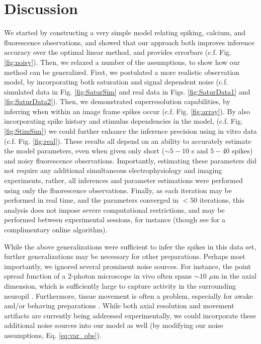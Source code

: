 \documentclass[12pt]{article}
\begin{document}

\section*{Discussion}


We started by constructing a very simple model relating spiking, calcium, and fluorescence observations, and showed that our approach both improves inference accuracy over the optimal linear method, and provides errorbars (c.f. Fig. \ref{fig:noisy}). Then, we relaxed a number of the assumptions, to show how our method can be generalized. First, we postulated a more realistic observation model, by incorporating both saturation and signal dependent noise (c.f. simulated data in Fig. \ref{fig:SaturSim} and real data in Figs. \ref{fig:SaturData1} and \ref{fig:SaturData2}). Then, we demonstrated superresolution capabilities, by inferring when within an image frame spikes occur (c.f. Fig. \ref{fig:array}). By also incorporating spike history and stimulus dependencies in the model, (c.f. Fig. \ref{fig:StimSim}) we could further enhance the inference precision using in vitro data (c.f. Fig. \ref{fig:real}). These results all depend on an ability to accurately estimate the model parameters, even when given only short ($\sim 5-10$ s and $5-40$ spikes) and noisy fluorescence observations.  Importantly, estimating these parameters did not require any additional simultaneous electrophysiology and imaging experiments, rather, all inferences and parameter estimations were performed using only the fluorescence observations. Finally, as each iteration may be performed in real time, and the parameters converged in $<50$ iterations, this analysis does not impose severe computational restrictions, and may be performed between experimental sessions, for instance (though see \cite{VogelsteinPaninski08b} for a complimentary online algorithm). 

While the above generalizations were sufficient to infer the spikes in this data set, further generalizations may be necessary for other preparations.  Perhaps most importantly, we ignored several prominent noise sources.  For instance, the point spread function of a 2-photon microscope in vivo often spans $\sim 10$ $\mu$m in the axial dimension, which is sufficiently large to capture activity in the surrounding neuropil \cite{GobelHelmchen07}. Furthermore, tissue movement is often a problem, especially for awake and/or behaving preparations \cite{DombeckTank07}. While both axial resolution and movement artifacts are currently being addressed experimentally, we could incorporate these additional noise sources into our model as well (by modifying our noise assumptions, Eq. \ref{eq:var_obs}).
\end{document}
